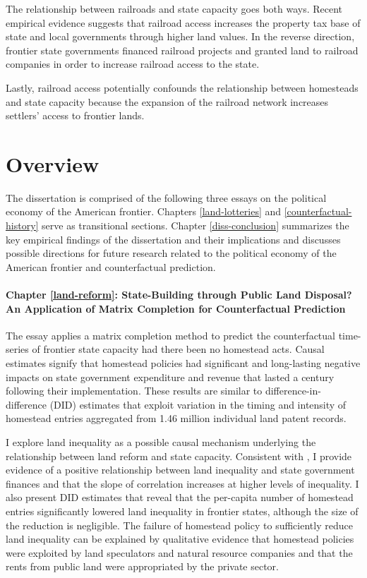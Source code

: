 The relationship between railroads and state capacity goes both ways. Recent empirical evidence suggests that railroad access increases the property tax base of state and local governments through higher land values. In the reverse direction, frontier state governments financed railroad projects and granted land to railroad companies in order to increase railroad access to the state. 

Lastly, railroad access potentially confounds the relationship between homesteads and state capacity because the expansion of the railroad network increases settlers' access to frontier lands. 

\section{Overview}

The dissertation is comprised of the following three essays on the political economy of the American frontier. Chapters \ref{land-lotteries} and \ref{counterfactual-history} serve as transitional sections. Chapter \ref{diss-conclusion} summarizes the key empirical findings of the dissertation and their implications and discusses possible directions for future research related to the political economy of the American frontier and counterfactual prediction.

\paragraph{Chapter \ref{land-reform}: State-Building through Public Land Disposal? An Application of Matrix Completion for Counterfactual Prediction}
The essay applies a matrix completion method to predict the counterfactual time-series of frontier state capacity had there been no homestead acts. Causal estimates signify that homestead policies had significant and long-lasting negative impacts on state government expenditure and revenue that lasted a century following their implementation. These results are similar to difference-in-difference (DID) estimates that exploit variation in the timing and intensity of homestead entries aggregated from 1.46 million individual land patent records.

I explore land inequality as a possible causal mechanism underlying the relationship between land reform and state capacity. Consistent with \citet{meltzer1981rational}, I provide evidence of a positive relationship between land inequality and state government finances and that the slope of correlation increases at higher levels of inequality. I also present DID estimates that reveal that the per-capita number of homestead entries significantly lowered land inequality in frontier states, although the size of the reduction is negligible. The failure of homestead policy to sufficiently reduce land inequality can be explained by qualitative evidence that homestead policies were exploited by land speculators and natural resource companies and that the rents from public land were appropriated by the private sector. 


